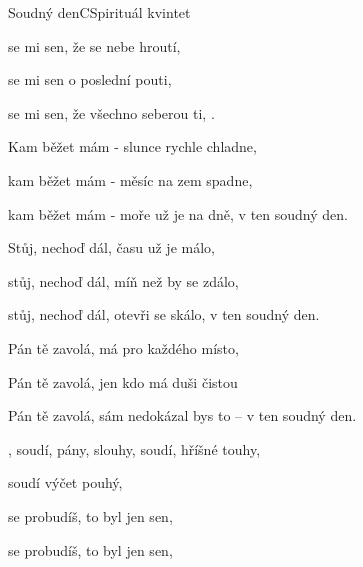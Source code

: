 \setcounter{page}{81}
\begin{song}{Soudný den}{C}{Spirituál kvintet}

\begin{SBVerse}

 se mi sen, že se nebe hroutí,

 se mi sen o poslední pouti,

 se mi sen, že všechno seberou ti,   .

\end{SBVerse}

\begin{SBVerse}

Kam běžet mám - slunce rychle chladne,

kam běžet mám - měsíc na zem spadne,

kam běžet mám - moře už je na dně, v ten soudný den.

\end{SBVerse}

\begin{SBVerse}

Stůj, nechoď dál, času už je málo,

stůj, nechoď dál, míň než by se zdálo,

stůj, nechoď dál, otevři se skálo, v ten soudný den.

\end{SBVerse}

\begin{SBVerse}

Pán tě zavolá, má pro každého místo,

Pán tě zavolá, jen kdo má duši čistou

Pán tě zavolá, sám nedokázal bys to -- v ten soudný den.

\end{SBVerse}

\begin{SBVerse}

, soudí, pány, slouhy,  soudí, hříšné touhy,

 soudí výčet pouhý,

\end{SBVerse}

\begin{SBChorus*}

 se probudíš, to byl jen sen,

 se probudíš, to byl jen sen,


\end{SBChorus*}
\end{song}
